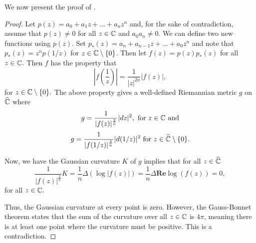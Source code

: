 We now present the proof of .

\begin{proof}
 Let $p(z)=a_0+a_1z+\ldots + a_nz^n$ and, for the sake of contradiction,
 assume that $p(z)\neq 0$ for all $z\in \mathbb{C}$ and $a_0a_n\neq 0.$
 We can define two new functions using $p(z)$.
 Set $p_*(z)=a_n+a_{n-1}z+\ldots + a_0z^n$ and note that $p_*(z)=z^np(1/z)$ for $z\in \mathbb{C}\setminus\{0\}$.
 Then let $f(z)=p(z)p_*(z)$ for all $z\in \mathbb{C}.$
 Then $f$ has the property that
 $$|f\left(\frac{1}{z}\right)|=\frac{1}{|z|^{2n}}|f(z)|,$$ for $z\in \mathbb{C}\setminus\{0\}.$
 The above property gives a well-defined Riemannian metric $g$ on $\widehat{\mathbb{C}}$
 where 
 $$g=\frac{1}{|f(z)|^{\frac{2}{n}}}|dz|^2, \textrm{ for } z\in \mathbb{C} \textrm{ and}$$
 $$g=\frac{1}{|f(1/z)|^{\frac{2}{n}}}|d(1/z)|^2 \textrm{ for } z\in \widehat{\mathbb{C}}\setminus\{0\}.$$
 
 Now, we have the Gaussian curvature $K$ of $g$ implies that for all $z\in \widehat{\mathbb{C}}$
 $$\frac{1}{|f(z)|^{\frac{2}{n}}} K =\frac{1}{n}\Delta(\log |f(z)|)=\frac{1}{n}\Delta \textbf{Re} \log(f(z))=0,$$
 for all $z\in \mathbb{C}.$ 
 
Thus, the Gaussian curvature at every point is zero. However, the Gauss-Bonnet
 theorem states that the sum of the curvature over all $z\in \mathbb{C}$ is $4\pi$, meaning there is at least
 one point where the curvature must be positive. This is a contradiction.
\end{proof}


